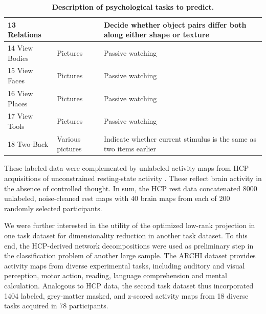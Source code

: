 \documentclass{article}
\begin{document}
\begin{table}[h]
{\begin{tabular}{l|l|l}
  13 Relations         &                                       & Decide whether object pairs differ both along either shape or texture             \\ \hline
  14 View Bodies       & Pictures                              & Passive watching                                                                   \\ \hline
  15 View Faces        & Pictures                              & Passive watching                                                                   \\ \hline
  16 View Places       & Pictures                              & Passive watching                                                                   \\ \hline
  17 View Tools        & Pictures                              & Passive watching                                                                   \\ \hline
  18 Two-Back          & Various pictures                      & Indicate whether current stimulus is the same as two items earlier                \\ \hline
  \end{tabular}
}
\vspace{-0.2cm}
\caption{\textbf{Description of psychological tasks to predict.}}
\label{table_tasks}
\end{table}

These labeled data were complemented by unlabeled activity maps
from HCP acquisitions of unconstrained resting-state activity
\cite{smith2013resting}.
These reflect brain activity in the absence of controlled thought.
In sum, the HCP rest data concatenated
8000 unlabeled, noise-cleaned rest maps with
40 brain maps from each of 200 randomly selected participants.

We were further interested in the utility of the
optimized low-rank projection
in one task dataset for dimensionality reduction in another task dataset.
To this end, the HCP-derived network decompositions were used as preliminary
step in the classification problem of another large sample.
The ARCHI dataset \cite{pinel07} provides activity maps from
diverse experimental tasks, including auditory and visual perception, motor action,
reading, language comprehension and mental calculation.
Analogous to HCP data, the second task dataset thus incorporated 1404
labeled, grey-matter masked, and z-scored activity maps
from 18 diverse tasks acquired in 78 participants.
\end{document}
